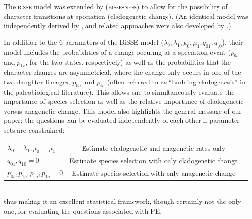 The \textsc{bisse} model was extended by \citet{MagnusonFord2012} (\textsc{bisse-ness}) to allow for the possibility of character transitions at speciation (cladogenetic change). (An identical model was independently derived by \citealt{Goldberg2012}, and related approaches were also developed by \citealt{Bokma2002, Bokma2008, Bokma2010}.) 


In addition to the 6 parameters of the BiSSE model ($\lambda_0, \lambda_1, \mu_0, \mu_1, q_{01}, q_{10}$), their model includes the probabilities of a change occuring at a speciation event ($p_{0c}$ and $p_{1c}$, for the two states, respectively) as well as the probabilities that the character changes are asymmetrical, where the change only occurs in one of the two daughter lineages, $p_{0a}$ and $p_{0b}$ (often referred to as ``budding cladogenesis'' in the paleobiological literature). This allows one to simultaneously evaluate the importance of species selection as well as the relative importance of cladogenetic versus anagenetic change. This model also highlights the general message of our paper; the questions can be evaluated independently of each other if parameter sets are constrained:

\begin{tabular}{ l c r }
  $\lambda_0 = \lambda_1, \mu_0 = \mu_1$ & Estimate cladogenetic and anagenetic rates only \\
  $q_{01}, q_{10} = \text{0}$ & Estimate species selection with only cladogenetic change \\
  $p_{0c}, p_{1c}, p_{0a}, p_{1a} = \text{0}$ & Estimate species selection with only anagenetic change\\
\end{tabular}\\

thus making it an excellent statistical framework, though certainly not the only one, for evaluating the questions associated with PE.


